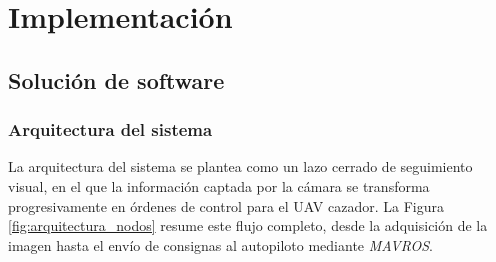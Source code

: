 \clearpage

\chapter*{Implementación}

\vspace{-1.5cm}
\noindent\HRule\par\vspace{0.1cm}

\section{Solución de software}




\subsection{Arquitectura del sistema}

La arquitectura del sistema se plantea como un lazo cerrado de seguimiento visual, en el que la información captada por la cámara se transforma progresivamente en órdenes de control para el UAV cazador. La Figura \ref{fig:arquitectura_nodos} resume este flujo completo, desde la adquisición de la imagen hasta el envío de consignas al autopiloto mediante \textit{MAVROS}.



\vspace{0.2cm}



